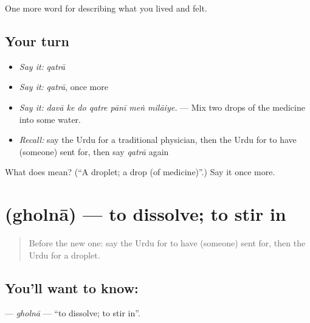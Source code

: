 \begin{grammarlens}[title={What you've built}]
One more word for describing what you lived and felt.
\end{grammarlens}

\subsection*{Your turn}
\begin{itemize}
\raggedright
  \item \emph{Say it:} \emph{qatrā}
  \item \emph{Say it:} \emph{qatrā}, once more
  \item \emph{Say it:} \emph{davā ke do qatre pānī meṅ milāiye.} — Mix two drops of the medicine into some water.
  \item \emph{Recall:} say the Urdu for a traditional physician, then the Urdu for to have (someone) sent for, then say \emph{qatrā} again
\end{itemize}

\begin{tcolorbox}[breakable,colback=teal!4,colframe=teal!35!black,title={Before you move on}]
What does  mean? (\textquotedblleft{}A droplet; a drop (of medicine)\textquotedblright{}.) Say it once more.
\end{tcolorbox}
\section[\texorpdfstring{\ur{گھولنا} (gholnā)}{گھولنا (gholnā)}]{ (gholnā) — to dissolve; to stir in}

\label{lesson:UR-C477-gholna}



\begin{quote}
Before the new one: say the Urdu for to have (someone) sent for, then the Urdu for a droplet.
\end{quote}

\subsection*{You'll want to know: }
\textbf{} — \emph{gholnā} — \textquotedblleft{}to dissolve; to stir in\textquotedblright{}.

\begin{quote}
     
\end{quote}

